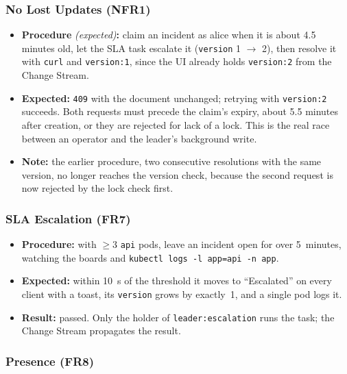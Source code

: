 \documentclass{scrartcl}
\begin{document}
\subsubsection{No Lost Updates (NFR1)}

\begin{itemize}
  \item \textbf{Procedure} \emph{(expected)}\textbf{:} claim an incident as alice when it is about 4.5 minutes old, let the SLA task escalate it (\texttt{version} 1 $\to$ 2), then resolve it with \texttt{curl} and \texttt{version:1}, since the UI already holds \texttt{version:2} from the Change Stream.
  \item \textbf{Expected:} \texttt{409} with the document unchanged; retrying with \texttt{version:2} succeeds. Both requests must precede the claim's expiry, about 5.5 minutes after creation, or they are rejected for lack of a lock. This is the real race between an operator and the leader's background write.
  \item \textbf{Note:} the earlier procedure, two consecutive resolutions with the same version, no longer reaches the version check, because the second request is now rejected by the lock check first.
\end{itemize}

\subsubsection{SLA Escalation (FR7)}

\begin{itemize}
  \item \textbf{Procedure:} with $\geq 3$ \texttt{api} pods, leave an incident open for over 5~minutes, watching the boards and \texttt{kubectl logs -l app=api -n app}.
  \item \textbf{Expected:} within 10~s of the threshold it moves to ``Escalated'' on every client with a toast, its \texttt{version} grows by exactly~1, and a single pod logs it.
  \item \textbf{Result:} passed. Only the holder of \texttt{leader:escalation} runs the task; the Change Stream propagates the result.
\end{itemize}

\subsubsection{Presence (FR8)}
\end{document}
